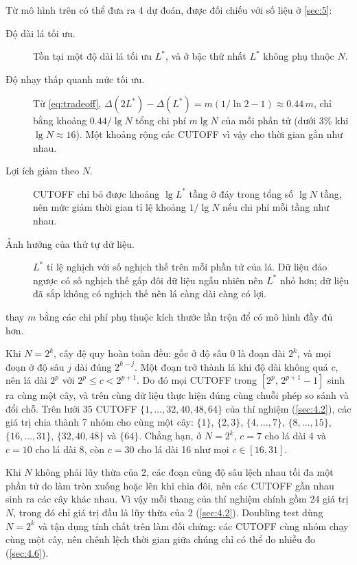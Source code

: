 \documentclass[12pt,a4paper]{article}
\begin{document}
Từ mô hình trên có thể đưa ra 4 dự đoán, được đối chiếu với số liệu ở \cref{sec:5}:
\begin{description}
  \item[Độ dài lá tối ưu.] Tồn tại một độ dài lá tối ưu $L^*$, và ở bậc thứ nhất $L^*$ không phụ thuộc $N$.
  \item[Độ nhạy thấp quanh mức tối ưu.] Từ \eqref{eq:tradeoff}, $\Delta(2L^*) - \Delta(L^*) = m(1/\ln 2 - 1) \approx 0.44\,m$, chỉ bằng khoảng $0.44/\lg N$ tổng chi phí $m \lg N$ của mỗi phần tử (dưới 3\% khi $\lg N \approx 16$). Một khoảng rộng các CUTOFF vì vậy cho thời gian gần như nhau.
  \item[Lợi ích giảm theo $N$.] CUTOFF chỉ bỏ được khoảng $\lg L^*$ tầng ở đáy trong tổng số $\lg N$ tầng, nên mức giảm thời gian tỉ lệ khoảng $1/\lg N$ nếu chi phí mỗi tầng như nhau.
  \item[Ảnh hưởng của thứ tự dữ liệu.] $L^*$ tỉ lệ nghịch với số nghịch thế trên mỗi phần tử của lá. Dữ liệu đảo ngược có số nghịch thế gấp đôi dữ liệu ngẫu nhiên nên $L^*$ nhỏ hơn; dữ liệu đã sắp không có nghịch thế nên lá càng dài càng có lợi.
\end{description}
 thay $m$ bằng các chi phí phụ thuộc kích thước lần trộn để có mô hình đầy đủ hơn.

Khi $N = 2^k$, cây đệ quy hoàn toàn đều: gốc ở độ sâu 0 là đoạn dài $2^k$, và mọi đoạn ở độ sâu $j$ dài đúng $2^{k-j}$. Một đoạn trở thành lá khi độ dài không quá $c$, nên lá dài $2^p$ với $2^p \le c < 2^{p+1}$. Do đó mọi CUTOFF trong $[2^p,\,2^{p+1}-1]$ sinh ra cùng một cây, và trên cùng dữ liệu thực hiện đúng cùng chuỗi phép so sánh và đổi chỗ. Trên lưới 35 CUTOFF $\{1,\dots,32,40,48,64\}$ của thí nghiệm (\cref{sec:4.2}), các giá trị chia thành 7 nhóm cho cùng một cây: $\{1\}$, $\{2,3\}$, $\{4,\dots,7\}$, $\{8,\dots,15\}$, $\{16,\dots,31\}$, $\{32,40,48\}$ và $\{64\}$. Chẳng hạn, ở $N = 2^k$, $c = 7$ cho lá dài 4 và $c = 10$ cho lá dài 8, còn $c = 30$ cho lá dài 16 như mọi $c \in [16, 31]$.

Khi $N$ không phải lũy thừa của 2, các đoạn cùng độ sâu lệch nhau tối đa một phần tử do làm tròn xuống hoặc lên khi chia đôi, nên các CUTOFF gần nhau sinh ra các cây khác nhau. Vì vậy mỗi thang của thí nghiệm chính gồm 24 giá trị $N$, trong đó chỉ giá trị đầu là lũy thừa của 2 (\cref{sec:4.2}). Doubling test dùng $N = 2^k$ và tận dụng tính chất trên làm đối chứng: các CUTOFF cùng nhóm chạy cùng một cây, nên chênh lệch thời gian giữa chúng chỉ có thể do nhiễu đo (\cref{sec:4.6}).
\end{document}
